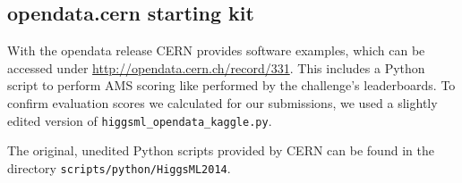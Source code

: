 \subsection*{opendata.cern starting kit}
With the opendata release CERN provides software examples, which can be accessed under \url{http://opendata.cern.ch/record/331}.
This includes a Python script to perform AMS scoring like performed by the challenge's leaderboards. To confirm evaluation scores we calculated for our submissions, we used a slightly edited version of \texttt{higgsml\_opendata\_kaggle.py}.

The original, unedited Python scripts provided by CERN can be found in the directory \texttt{scripts/python/HiggsML2014}.